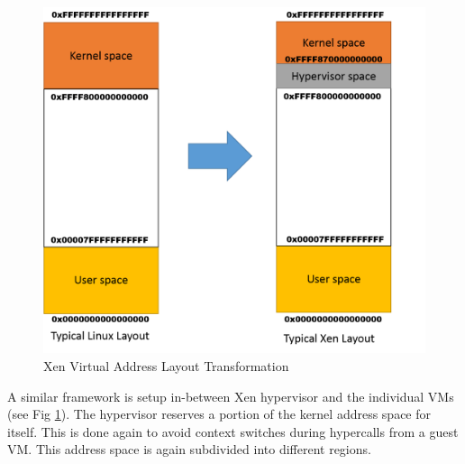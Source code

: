 \begin{figure}[H]
\centering
\includegraphics[scale=0.7]{figures/VA_layout_hypervisor.png}
\caption{Xen Virtual Address Layout Transformation}
\label{fig:xen_layout}
\end{figure}

A similar framework is setup in-between Xen hypervisor and the individual VMs (see Fig \ref{fig:xen_layout}). The hypervisor reserves a portion of the kernel address space for itself. This is done again to avoid context switches during hypercalls from a guest VM. This address space is again subdivided into different regions. 

